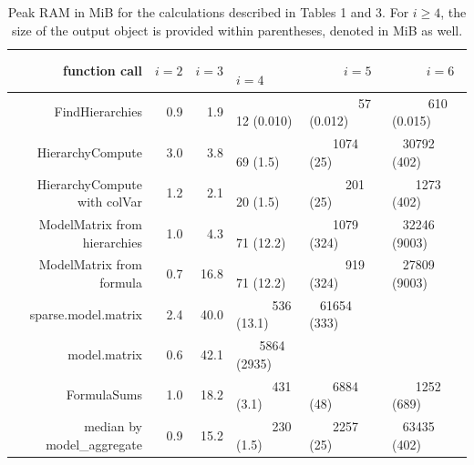 \begin{table}[p]

\caption{\label{tab:tab2-pdf}Peak RAM in MiB for the calculations described in Tables 1 and 3. For $i\geq 4$, the size of the output object is provided within parentheses, denoted in MiB as well.}
\centering
\begin{tabular}[t]{r|r|r|l|l|l}
\hline
function call & $i = 2$ & $i = 3$ &      $i = 4$ &      $i = 5$ &      $i = 6$\\
\hline
FindHierarchies & 0.9 & 1.9 &         12   (0.010) &         57   (0.012) &       610   (0.015)\\
\hline
HierarchyCompute & 3.0 & 3.8 &         69   (1.5) &     1074   (25) &   30792   (402)\\
\hline
HierarchyCompute with colVar & 1.2 & 2.1 &         20   (1.5) &       201   (25) &     1273   (402)\\
\hline
ModelMatrix from hierarchies & 1.0 & 4.3 &         71   (12.2) &     1079   (324) &   32246   (9003)\\
\hline
ModelMatrix from formula & 0.7 & 16.8 &         71   (12.2) &       919   (324) &   27809   (9003)\\
\hline
sparse.model.matrix & 2.4 & 40.0 &       536   (13.1) &   61654   (333) &          \\
\hline
model.matrix & 0.6 & 42.1 &     5864   (2935) &           &          \\
\hline
FormulaSums & 1.0 & 18.2 &       431   (3.1) &     6884   (48) &     1252   (689)\\
\hline
median by model\_aggregate & 0.9 & 15.2 &       230   (1.5) &     2257   (25) &   63435   (402)\\
\hline
\end{tabular}
\vspace{20pt} \end{table}

